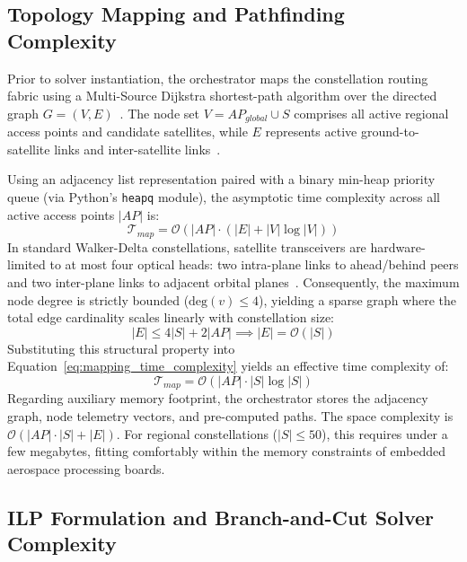 \subsection{Topology Mapping and Pathfinding Complexity}
\label{subsec:complexity_mapping}

Prior to solver instantiation, the orchestrator maps the constellation routing fabric using a Multi-Source Dijkstra shortest-path algorithm over the directed graph $G = (V, E)$~\cite{dijkstra1959note}. 
The node set $V = AP_{global} \cup S$ comprises all active regional access points and candidate satellites, while $E$ represents active ground-to-satellite links and inter-satellite links~\cite{icdcs_satellite_2025}.

Using an adjacency list representation paired with a binary min-heap priority queue (via Python's \texttt{heapq} module), the asymptotic time complexity across all active access points $|AP|$ is:
\begin{equation}
    \mathcal{T}_{map} = \mathcal{O}\left( |AP| \cdot \left( |E| + |V| \log |V| \right) \right)
    \label{eq:mapping_time_complexity}
\end{equation}
In standard Walker-Delta constellations, satellite transceivers are hardware-limited to at most four optical heads: two intra-plane links to ahead/behind peers and two inter-plane links to adjacent orbital planes~\cite{walker1984satellite, chen2021isl}. 
Consequently, the maximum node degree is strictly bounded ($\text{deg}(v) \le 4$), yielding a sparse graph where the total edge cardinality scales linearly with constellation size:
\begin{equation}
    |E| \le 4|S| + 2|AP| \implies |E| = \mathcal{O}(|S|)
\end{equation}
Substituting this structural property into Equation~\eqref{eq:mapping_time_complexity} yields an effective time complexity of:
\begin{equation}
    \mathcal{T}_{map} = \mathcal{O}\left( |AP| \cdot |S| \log |S| \right)
\end{equation}
Regarding auxiliary memory footprint, the orchestrator stores the adjacency graph, node telemetry vectors, and pre-computed paths. 
The space complexity is $\mathcal{O}(|AP| \cdot |S| + |E|)$. For regional constellations ($|S| \le 50$), this requires under a few megabytes, fitting comfortably within the memory constraints of embedded aerospace processing boards.

\subsection{ILP Formulation and Branch-and-Cut Solver Complexity}
\label{subsec:complexity_solver}

